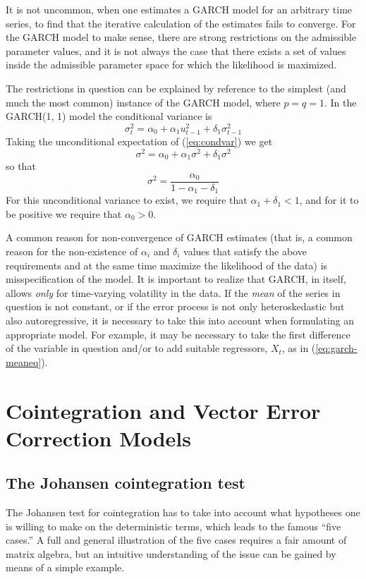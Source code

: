 It is not uncommon, when one estimates a GARCH model for an arbitrary
time series, to find that the iterative calculation of the estimates
fails to converge.  For the GARCH model to make sense, there are
strong restrictions on the admissible parameter values, and it is not
always the case that there exists a set of values inside the
admissible parameter space for which the likelihood is maximized.  

The restrictions in question can be explained by reference to the
simplest (and much the most common) instance of the GARCH model, where
$p = q = 1$.  In the GARCH(1, 1) model the conditional variance is
\begin{equation}
\label{eq:condvar}
\sigma^2_t = \alpha_0 + \alpha_1 u^2_{t-1} + \delta_1 \sigma^2_{t-1}
\end{equation}
Taking the unconditional expectation of (\ref{eq:condvar}) we get
\[
\sigma^2 = \alpha_0 + \alpha_1 \sigma^2 + \delta_1 \sigma^2
\]
so that
\[
\sigma^2 = \frac{\alpha_0}{1 - \alpha_1 - \delta_1}
\]
For this unconditional variance to exist, we require that $\alpha_1 +
\delta_1 < 1$, and for it to be positive we require that $\alpha_0 > 0$.

A common reason for non-convergence of GARCH estimates (that is, a
common reason for the non-existence of $\alpha_i$ and $\delta_i$ values
that satisfy the above requirements and at the same time maximize the
likelihood of the data) is misspecification of the model.  It is
important to realize that GARCH, in itself, allows \textit{only} for
time-varying volatility in the data.  If the \textit{mean} of the
series in question is not constant, or if the error process is not
only heteroskedastic but also autoregressive, it is necessary to take
this into account when formulating an appropriate model.  For example,
it may be necessary to take the first difference of the variable in
question and/or to add suitable regressors, $X_t$, as in
(\ref{eq:garch-meaneq}).

\section{Cointegration and Vector Error Correction Models}
\label{vecm-explanation}

\subsection{The Johansen cointegration test}
\label{sec:johansen-test}

The Johansen test for cointegration has to take into account what
hypotheses one is willing to make on the deterministic terms, which
leads to the famous ``five cases.'' A full and general illustration of
the five cases requires a fair amount of matrix algebra, but an
intuitive understanding of the issue can be gained by means of a
simple example.
    
